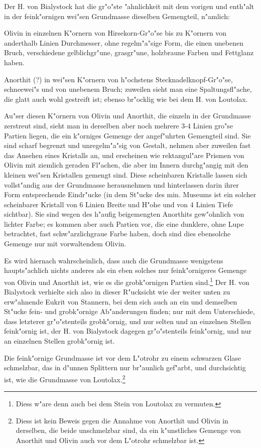 \documentclass[a4paper, 11pt, oneside, german]{article}
\begin{document}
Der H. von Bialystock hat die gr"o"ste "ahnlichkeit mit dem vorigen und enth"alt in der feink"ornigen wei"sen Grundmasse dieselben Gemengteil, n"amlich:

Olivin in einzelnen K"ornern von Hirsekorn-Gr"o"se bis zu K"ornern von anderthalb Linien Durchmesser, ohne regelm"a"sige Form, die einen unebenen Bruch, verschiedene gelblichgr"une, grasgr"une, holzbraune Farben und Fettglanz haben.

Anorthit (?) in wei"sen K"ornern von h"ochstens Stecknadelknopf-Gr"o"se, schneewei"s und von unebenem Bruch; zuweilen sieht man eine Spaltungsfl"ache, die glatt auch wohl gestreift ist; ebenso br"ocklig wie bei dem H. von Loutolax.

Au"ser diesen K"ornern von Olivin und Anorthit, die einzeln in der Grundmasse zerstreut sind, sieht man in derselben aber noch mehrere 3-4 Linien gro"se Partien liegen, die ein k"orniges Gemenge der angef"uhrten Gemengteil sind. Sie sind scharf begrenzt und unregelm"a"sig von Gestalt, nehmen aber zuweilen fast das Ansehen eines Kristalls an, und erscheinen wie rektangul"are Prismen von Olivin mit ziemlich geraden Fl"achen, die aber im Innern durchg"angig mit den kleinen wei"sen Kristallen gemengt sind. Diese scheinbaren Kristalle lassen sich vollst"andig aus der Grundmasse herausnehmen und hinterlassen darin ihrer Form entsprechende Eindr"ucke (in dem St"ucke des min. Museums ist ein solcher scheinbarer Kristall von 6 Linien Breite und H"ohe und von 4 Linien Tiefe sichtbar). Sie sind wegen des h"aufig beigemengten Anorthits gew"ohnlich von lichter Farbe; es kommen aber auch Partien vor, die eine dunklere, ohne Lupe betrachtet, fast schw"arzlichgraue Farbe haben, doch sind dies ebensolche Gemenge nur mit vorwaltendem Olivin.

Es wird hiernach wahrscheinlich, dass auch die Grundmasse wenigstens haupts"achlich nichts anderes als ein eben solches nur feink"ornigeres Gemenge von Olivin und Anorthit ist, wie es die grobk"ornigen Partien sind.\footnote{Diess w"are denn auch bei dem Stein von Loutolax zu vermuten.} Der H. von Bialystock verhielte sich also in dieser R"ucksicht wie der weiter unten zu erw"ahnende Eukrit von Stannern, bei dem sich auch an ein und demselben St"ucke fein- und grobk"ornige Ab"anderungen finden; nur mit dem Unterschiede, dass letzterer gr"o"stenteils grobk"ornig, und nur selten und an einzelnen Stellen feink"ornig ist, der H. von Bialystock dagegen gr"o"stenteils feink"ornig, und nur an einzelnen Stellen grobk"ornig ist.

Die feink"ornige Grundmasse ist vor dem L"otrohr zu einem schwarzen Glase schmelzbar, das in d"unnen Splittern nur br"aunlich gef"arbt, und durchsichtig ist, wie die Grundmasse von Loutolax.\footnote{Diess ist kein Beweis gegen die Annahme von Anorthit und Olivin in derselben, die beide unschmelzbar sind, da ein k"unstliches Gemenge von Anorthit und Olivin auch vor dem L"otrohr schmelzbar ist.}
\end{document}
